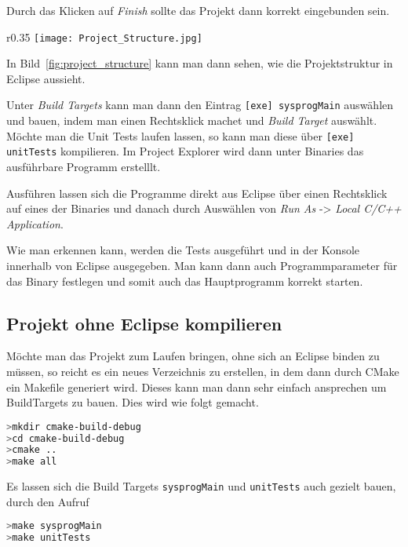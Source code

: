 Durch das Klicken auf \textit{Finish} sollte das Projekt dann korrekt eingebunden sein.
\clearpage

\setlength{\intextsep}{-20pt}%
\begin{wrapfigure}{r}{0.35\textwidth}
  \centering
    \texttt{[image: Project\_Structure.jpg]}
    \caption{Die Projekt\-struktur in Eclipse}\label{fig:project_structure}
\end{wrapfigure}

In Bild~\ref{fig:project_structure} kann man dann sehen, wie die Projektstruktur in Eclipse aussieht.

Unter \textit{Build Targets} kann man dann den Eintrag \texttt{[exe] sysprogMain} auswählen und bauen, indem man einen Rechtsklick machet und \textit{Build Target} auswählt. Möchte man die Unit Tests laufen lassen, so kann man diese über \texttt{[exe] unitTests} kompilieren. Im Project Explorer wird dann unter Binaries das ausführbare Programm erstelllt.


Ausführen lassen sich die Programme direkt aus Eclipse über einen Rechtsklick auf eines der Binaries und danach durch Auswählen von \textit{Run As} -> \textit{Local C/C++ Application}.

Wie man erkennen kann, werden die Tests ausgeführt und in der Konsole innerhalb von Eclipse ausgegeben. Man kann dann auch Programmparameter für das Binary festlegen und somit auch das Hauptprogramm korrekt starten.

\subsection{Projekt ohne Eclipse kompilieren}
Möchte man das Projekt zum Laufen bringen, ohne sich an Eclipse binden zu müssen, so reicht es ein neues Verzeichnis zu erstellen, in dem dann durch CMake ein Makefile generiert wird. Dieses kann man dann sehr einfach ansprechen um BuildTargets zu bauen. Dies wird wie folgt gemacht.

\begin{lstlisting}[language=bash,numbers=none]
>mkdir cmake-build-debug
>cd cmake-build-debug
>cmake ..
>make all
\end{lstlisting}

Es lassen sich die Build Targets \texttt{sysprogMain} und \texttt{unitTests} auch gezielt bauen, durch den Aufruf

\begin{lstlisting}[language=bash,numbers=none]
>make sysprogMain
>make unitTests
\end{lstlisting}

